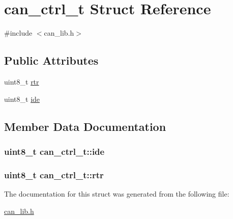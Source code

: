 \hypertarget{structcan__ctrl__t}{}\section{can\+\_\+ctrl\+\_\+t Struct Reference}
\label{structcan__ctrl__t}


{\ttfamily \#include $<$can\+\_\+lib.\+h$>$}

\subsection*{Public Attributes}
\begin{DoxyCompactItemize}
\item 
uint8\+\_\+t \hyperlink{structcan__ctrl__t_a8bd2d2588d0e4dc268b757a441b779a6}{rtr}
\item 
uint8\+\_\+t \hyperlink{structcan__ctrl__t_a1663dddb7beffb0792c3cdeb1c54d3de}{ide}
\end{DoxyCompactItemize}


\subsection{Member Data Documentation}
\subsubsection[{\texorpdfstring{ide}{ide}}]{\setlength{\rightskip}{0pt plus 5cm}uint8\+\_\+t can\+\_\+ctrl\+\_\+t\+::ide}\hypertarget{structcan__ctrl__t_a1663dddb7beffb0792c3cdeb1c54d3de}{}\label{structcan__ctrl__t_a1663dddb7beffb0792c3cdeb1c54d3de}
\subsubsection[{\texorpdfstring{rtr}{rtr}}]{\setlength{\rightskip}{0pt plus 5cm}uint8\+\_\+t can\+\_\+ctrl\+\_\+t\+::rtr}\hypertarget{structcan__ctrl__t_a8bd2d2588d0e4dc268b757a441b779a6}{}\label{structcan__ctrl__t_a8bd2d2588d0e4dc268b757a441b779a6}


The documentation for this struct was generated from the following file\+:\begin{DoxyCompactItemize}
\item 
\hyperlink{can__lib_8h}{can\+\_\+lib.\+h}\end{DoxyCompactItemize}

